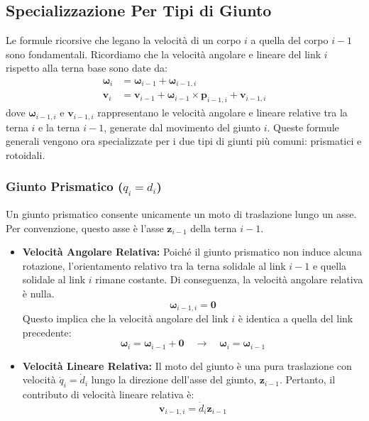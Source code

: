﻿\documentclass[11pt, a4paper]{article}
\begin{document}
\newpage
\subsection{Specializzazione Per Tipi di Giunto}
Le formule ricorsive che legano la velocità di un corpo \(i\) a quella del corpo \(i-1\) sono fondamentali. Ricordiamo che la velocità angolare e lineare del link \(i\) rispetto alla terna base sono date da:
\begin{align*}
    \bm{\omega}_i &= \bm{\omega}_{i-1} + \bm{\omega}_{i-1,i} \\
    \bm{v}_i &= \bm{v}_{i-1} + \bm{\omega}_{i-1} \times \bm{p}_{i-1,i} + \bm{v}_{i-1,i}
\end{align*}
dove \(\bm{\omega}_{i-1,i}\) e \(\bm{v}_{i-1,i}\) rappresentano le velocità angolare e lineare relative tra la terna \(i\) e la terna \(i-1\), generate dal movimento del giunto \(i\). Queste formule generali vengono ora specializzate per i due tipi di giunti più comuni: prismatici e rotoidali.

\subsubsection{Giunto Prismatico (\texorpdfstring{$q_i = d_i$}{qi = di})}
Un giunto prismatico consente unicamente un moto di traslazione lungo un asse. Per convenzione, questo asse è l'asse \(\bm{z}_{i-1}\) della terna \(i-1\).

\begin{itemize}
    \item \textbf{Velocità Angolare Relativa:} Poiché il giunto prismatico non induce alcuna rotazione, l'orientamento relativo tra la terna solidale al link \(i-1\) e quella solidale al link \(i\) rimane costante. Di conseguenza, la velocità angolare relativa è nulla.
    \[
        \bm{\omega}_{i-1,i} = \bm{0}
    \]
    Questo implica che la velocità angolare del link \(i\) è identica a quella del link precedente:
    \[
        \bm{\omega}_i = \bm{\omega}_{i-1} + \bm{0} \quad \longrightarrow \quad \bm{\omega}_i = \bm{\omega}_{i-1}
    \]

    \item \textbf{Velocità Lineare Relativa:} Il moto del giunto è una pura traslazione con velocità \(\dot{q}_i = \dot{d}_i\) lungo la direzione dell'asse del giunto, \(\bm{z}_{i-1}\). Pertanto, il contributo di velocità lineare relativa è:
    \[
        \bm{v}_{i-1,i} = \dot{d}_i \bm{z}_{i-1}
    \]
\end{itemize}
\end{document}
